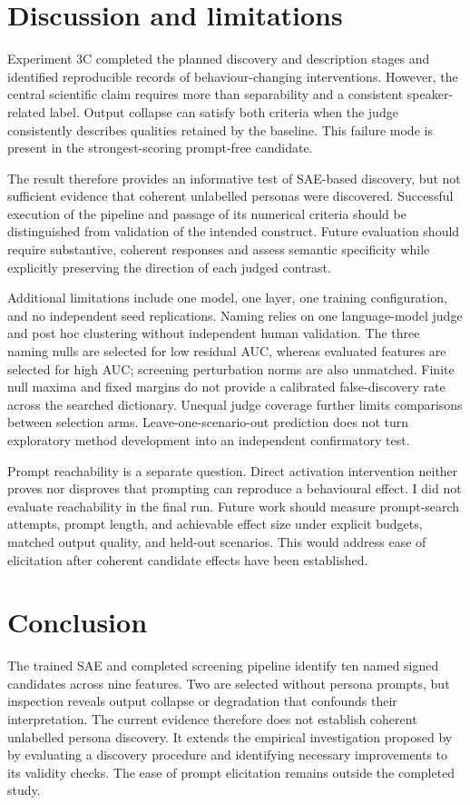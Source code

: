 \documentclass[11pt]{article}
\begin{document}
\section{Discussion and limitations}
Experiment 3C completed the planned discovery and description stages and
identified reproducible records of behaviour-changing interventions. However,
the central scientific claim requires more than separability and a consistent
speaker-related label. Output collapse can satisfy both criteria when the judge
consistently describes qualities retained by the baseline. This failure mode is
present in the strongest-scoring prompt-free candidate.

The result therefore provides an informative test of SAE-based discovery, but
not sufficient evidence that coherent unlabelled personas were discovered.
Successful execution of the pipeline and passage of its numerical criteria should
be distinguished from validation of the intended construct. Future evaluation
should require substantive, coherent responses and assess semantic specificity
while explicitly preserving the direction of each judged contrast.

Additional limitations include one model, one layer, one training configuration,
and no independent seed replications. Naming relies on one language-model judge
and post hoc clustering without independent human validation. The three naming
nulls are selected for low residual AUC, whereas evaluated features are selected
for high AUC; screening perturbation norms are also unmatched. Finite null maxima
and fixed margins do not provide a calibrated false-discovery rate across the
searched dictionary. Unequal judge coverage further limits comparisons between
selection arms. Leave-one-scenario-out prediction does not turn exploratory
method development into an independent confirmatory test.

Prompt reachability is a separate question. Direct activation intervention neither
proves nor disproves that prompting can reproduce a behavioural effect. I did not
evaluate reachability in the final run. Future work should measure prompt-search
attempts, prompt length, and achievable effect size under explicit budgets,
matched output quality, and held-out scenarios. This would address ease of
elicitation after coherent candidate effects have been established.

\section{Conclusion}
The trained SAE and completed screening pipeline identify ten named signed
candidates across nine features. Two are selected without persona prompts, but
inspection reveals output collapse or degradation that confounds their
interpretation. The current evidence therefore does not establish coherent
unlabelled persona discovery. It extends the empirical investigation proposed by
\citet{chen2025persona} by evaluating a discovery procedure and identifying
necessary improvements to its validity checks. The ease of prompt elicitation
remains outside the completed study.
\end{document}
